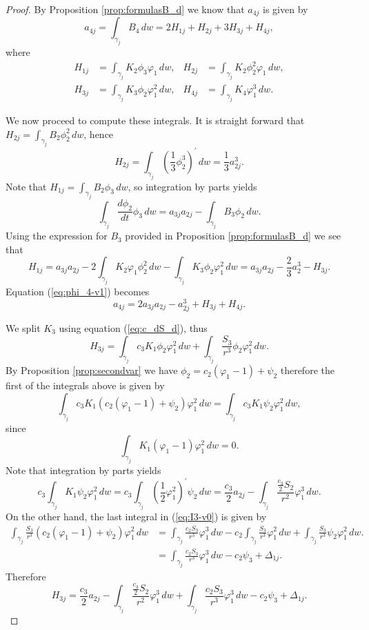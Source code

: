 \begin{proof}
By Proposition \ref{prop:formulasB_d} we know that $a_{4j}$ is given by
\begin{equation}\label{eq:phi_4-v1}
 a_{4j}=\int_{\gamma_j} B_4\,dw = 2H_{1j}+H_{2j}+3H_{3j}+H_{4j}, 
\end{equation}
where 
\begin{align*}
H_{1j}&=\int_{\gamma_j} K_2\phi_3\varphi_1\,dw, &	H_{2j}&=\int_{\gamma_j} K_2\phi_2^2\varphi_1\,dw,\\ H_{3j}&=\int_{\gamma_j} K_3\phi_2\varphi_1^2\,dw, &	H_{4j}&=\int_{\gamma_j} K_4\varphi_1^3\,dw. 
\end{align*}

We now proceed to compute these integrals. It is straight forward that $H_{2j}=\int_{\gamma_j} B_2\phi_2^2\,dw$, hence
\[ H_{2j}=\int_{\gamma_j}\left(\frac{1}{3}\phi_2^3\right)^{\prime}\,dw=\frac{1}{3}a_{2j}^3. \] 
Note that  $H_{1j}=\int_{\gamma_j} B_2\phi_3\,dw$, so integration by parts yields
\[ \int_{\gamma_j}\frac{d\phi_2}{dt}\phi_3\,dw = a_{3j}a_{2j}-\int_{\gamma_j} B_3\phi_2\,dw. \]
Using the expression for $B_3$ provided in Proposition \ref{prop:formulasB_d} we see that
\[ H_{1j}=a_{3j}a_{2j}-2\int_{\gamma_j}K_2\varphi_1\phi_2^2\,dw-\int_{\gamma_j}K_3\phi_2\varphi_1^2\,dw=a_{3j}a_{2j}-\frac{2}{3}a_2^3-H_{3j}. \]
Equation (\ref{eq:phi_4-v1}) becomes 
\begin{equation}\label{eq:phi_4-v2}
a_{4j}=2a_{3j}a_{2j}-a_{2j}^3+H_{3j}+H_{4j}. 
\end{equation}

We split $K_3$ using equation (\ref{eq:c_dS_d}), thus
\begin{equation}\label{eq:I3-v0}
 H_{3j}=\int_{\gamma_j}c_3K_1\phi_2\varphi_1^2\,dw + \int_{\gamma_j}\frac{S_3}{r^3}\phi_2\varphi_1^2\,dw. 
\end{equation}
By Proposition \ref{prop:secondvar} we have $\phi_2=c_2(\varphi_1-1)+\psi_2$ therefore the first of the integrals above is given by
\[ \int_{\gamma_j}c_3K_1( c_2(\varphi_1-1)+\psi_2)\varphi_1^2\,dw=\int_{\gamma_j}c_3K_1\psi_2\varphi_1^2\,dw, \]
since 
\[ \int_{\gamma_j}K_1(\varphi_1-1)\varphi_1^2\,dw=0. \]
Note that integration by parts yields
\[ c_3\int_{\gamma_j}K_1\psi_2\varphi_1^2\,dw=c_3\int_{\gamma_j}\left(\frac{1}{2}\varphi_1^2\right)^{\prime} \psi_2\,dw=\frac{c_3}{2}a_{2j}-\int_{\gamma_j}\frac{\frac{c_3}{2}S_2}{r^2}\varphi_1^3\,dw. \]
On the other hand, the last integral in (\ref{eq:I3-v0}) is given by
\begin{align*} 
 \int_{\gamma_j}\frac{S_3}{r^3}( c_2(\varphi_1-1)+\psi_2)\varphi_1^2\,dw &= \int_{\gamma_j}\frac{c_2S_3}{r^3}\varphi_1^3\,dw-c_2\int_{\gamma_j}\frac{S_3}{r^3}\varphi_1^2\,dw+\int_{\gamma_j}\frac{S_3}{r^3}\psi_2\varphi_1^2\,dw. \\
								  &= \int_{\gamma_j}\frac{c_2S_3}{r^3}\varphi_1^3\,dw-c_2\psi_3+\Delta_{1j}.
\end{align*}
Therefore
\[ H_{3j}= \frac{c_3}{2}a_{2j}-\int_{\gamma_j}\frac{\frac{c_3}{2}S_2}{r^2}\varphi_1^3\,dw+\int_{\gamma_j}\frac{c_2S_3}{r^3}\varphi_1^3\,dw-c_2\psi_3+\Delta_{1j}. \]


\end{proof}
